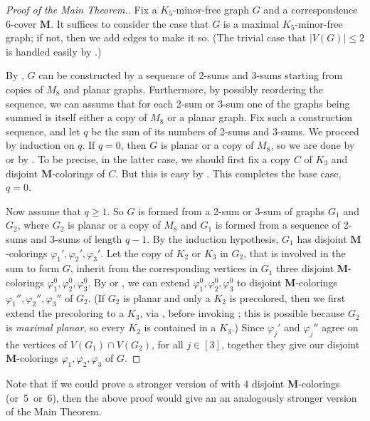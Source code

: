 \documentclass[11pt]{article}
\theoremstyle{definition}
\newcommand\vph{\varphi}
\renewcommand\ge{\geqslant}
\renewcommand\le{\leqslant}
\newcommand\MM{\textbf{M}}
\begin{document}
\begin{proof}[Proof of the Main Theorem.]
	Fix a $K_5$-minor-free graph $G$ and a correspondence 6-cover $\MM$.  It suffices to consider
	the case that $G$ is a maximal $K_5$-minor-free graph; if not, then we add edges to make it so.
	(The trivial case that $|V(G)|\le 2$ is handled easily by .)

	By , $G$ can be constructed by a sequence of 2-sums and 3-sums starting from
	copies of $M_8$ and planar graphs.  Furthermore, by possibly reordering the sequence, we can assume
	that for each 2-sum or 3-sum one of the graphs being summed is itself either a copy of $M_8$ or a 
	planar graph.  Fix such a construction sequence, and let $q$ be the sum of its
	numbers of 2-sums and 3-sums.  We proceed by induction on $q$.  If $q=0$, then $G$ is planar or a 
	copy of $M_8$, so we are done by  or by .  To be precise, in the latter
	case, we should first fix a copy $C$ of $K_3$ and disjoint $\MM$-colorings of $C$.  But this
	is easy by .  This completes the base case, $q=0$.

	Now assume that $q\ge 1$.  So $G$ is formed from a 2-sum or 3-sum of graphs $G_1$ and $G_2$,
	where $G_2$ is planar or a copy of $M_8$ and $G_1$ is formed from a sequence of 2-sums and
	3-sums of length $q-1$.  By the induction hypothesis, $G_1$ has
	disjoint $\MM$-colorings $\vph_1',\vph_2',\vph_3'$.  Let the copy of $K_2$ or $K_3$ in $G_2$, 
	that is involved in the sum to form $G$, inherit from the corresponding vertices in $G_1$ three
	disjoint $\MM$-colorings $\vph_1^0,\vph_2^0,\vph_3^0$.  By  or , 
	we can extend $\vph_1^0,\vph_2^0,\vph_3^0$ to disjoint $\MM$-colorings $\vph_1'',\vph_2'', 
	\vph_3''$ of $G_2$.  (If $G_2$ is planar and only a $K_2$ is precolored, then we first extend 
	the precoloring to a $K_3$, via , before invoking ; this is possible 
	because $G_2$ is \emph{maximal planar}, so every $K_2$ is contained in a $K_3$.) Since 
	$\vph_j'$ and $\vph_j''$ agree on the vertices of $V(G_1)\cap V(G_2)$, for all $j\in[3]$, 
	together they give our disjoint $\MM$-colorings $\vph_1,\vph_2,\vph_3$ of $G$.
\end{proof}

Note that if we could prove a stronger version of  with 
4 disjoint $\MM$-colorings (or~5~or~6), then the above
proof  would give an an analogously stronger version of the Main Theorem.
\end{document}
